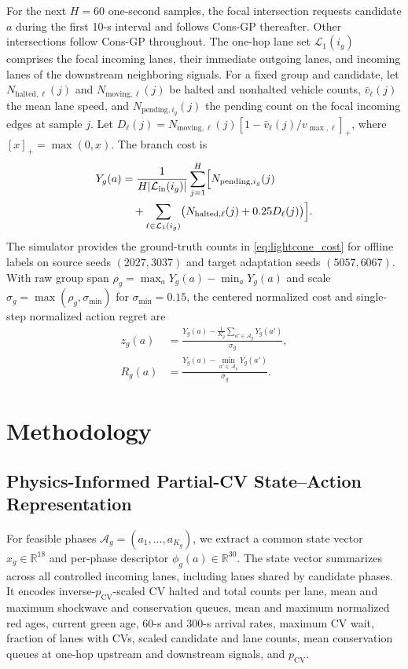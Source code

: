 \documentclass[letterpaper,journal]{IEEEtran}
\newcommand{\R}{\mathbb{R}}
\begin{document}
For the next $H=60$ one-second samples, the focal intersection requests candidate $a$ during the first 10-s interval and follows Cons-GP thereafter. Other intersections follow Cons-GP throughout. The one-hop lane set $\mathcal{L}_1(i_g)$ comprises the focal incoming lanes, their immediate outgoing lanes, and incoming lanes of the downstream neighboring signals. For a fixed group and candidate, let $N_{\mathrm{halted},\ell}(j)$ and $N_{\mathrm{moving},\ell}(j)$ be halted and nonhalted vehicle counts, $\bar v_\ell(j)$ the mean lane speed, and $N_{\mathrm{pending},i_g}(j)$ the pending count on the focal incoming edges at sample $j$. Let $D_\ell(j)=N_{\mathrm{moving},\ell}(j)[1-\bar v_\ell(j)/v_{\max,\ell}]_+$, where $[x]_+=\max(0,x)$. The branch cost is
\begin{equation}
\begin{split}
  Y_g(a)&=\frac{1}{H|\mathcal{L}_{\mathrm{in}}(i_g)|}
   \sum_{j=1}^{H}\Bigl[N_{\mathrm{pending},i_g}(j)\\
   &\quad+\sum_{\ell\in\mathcal{L}_1(i_g)}
      \bigl(N_{\mathrm{halted},\ell}(j)+0.25D_\ell(j)\bigr)\Bigr].
\end{split}
  \label{eq:lightcone_cost}
\end{equation}
The simulator provides the ground-truth counts in \eqref{eq:lightcone_cost} for offline labels on source seeds $(2027,3037)$ and target adaptation seeds $(5057,6067)$. With raw group span $\rho_g=\max_a Y_g(a)-\min_a Y_g(a)$ and scale $\sigma_g=\max(\rho_g,\sigma_{\min})$ for $\sigma_{\min}=0.15$, the centered normalized cost and single-step normalized action regret are
\begin{align}
  z_g(a) &= \frac{Y_g(a)-\frac{1}{K_g}\sum_{a'\in\mathcal{A}_g}Y_g(a')}{\sigma_g},\nonumber\\
  R_g(a) &= \frac{Y_g(a)-\min_{a'\in\mathcal{A}_g}Y_g(a')}{\sigma_g}.
  \label{eq:norm_cost}
\end{align}

\section{Methodology}
\label{sec:method}

\subsection{Physics-Informed Partial-CV State--Action Representation}
For feasible phases $\mathcal{A}_g=(a_1,\dots,a_{K_g})$, we extract a common state vector $x_g\in\R^{18}$ and per-phase descriptor $\phi_g(a)\in\R^{30}$. The state vector summarizes across all controlled incoming lanes, including lanes shared by candidate phases. It encodes inverse-$p_{\mathrm{CV}}$-scaled CV halted and total counts per lane, mean and maximum shockwave and conservation queues, mean and maximum normalized red ages, current green age, 60-s and 300-s arrival rates, maximum CV wait, fraction of lanes with CVs, scaled candidate and lane counts, mean conservation queues at one-hop upstream and downstream signals, and $p_{\mathrm{CV}}$.
\end{document}

